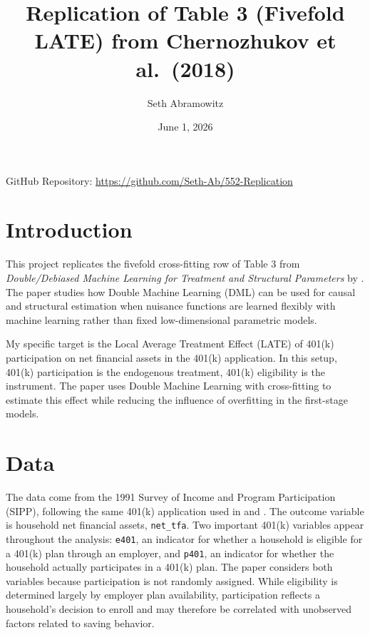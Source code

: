 \documentclass[12pt]{article}
\title{Replication of Table 3 (Fivefold LATE) from Chernozhukov et al.\ (2018)}
\author{Seth Abramowitz}
\date{June 1, 2026}
\begin{document}
\maketitle

\begin{center}
\small GitHub Repository: \href{https://github.com/Seth-Ab/552-Replication}{https://github.com/Seth-Ab/552-Replication}
\end{center}

\section{Introduction}

This project replicates the fivefold cross-fitting row of Table 3 from \textit{Double/Debiased Machine Learning for Treatment and Structural Parameters} by \citet{chernozhukov2018}. The paper studies how Double Machine Learning (DML) can be used for causal and structural estimation when nuisance functions are learned flexibly with machine learning rather than fixed low-dimensional parametric models.

My specific target is the Local Average Treatment Effect (LATE) of 401(k) participation on net financial assets in the 401(k) application. In this setup, 401(k) participation is the endogenous treatment, 401(k) eligibility is the instrument. The paper uses Double Machine Learning with cross-fitting to estimate this effect while reducing the influence of overfitting in the first-stage models.

\section{Data}

The data come from the 1991 Survey of Income and Program Participation (SIPP), following the same 401(k) application used in \citet{abadie2003} and \citet{chernozhukov2018}. The outcome variable is household net financial assets, \texttt{net\_tfa}. Two important 401(k) variables appear throughout the analysis: \texttt{e401}, an indicator for whether a household is eligible for a 401(k) plan through an employer, and \texttt{p401}, an indicator for whether the household actually participates in a 401(k) plan. The paper considers both variables because participation is not randomly assigned. While eligibility is determined largely by employer plan availability, participation reflects a household's decision to enroll and may therefore be correlated with unobserved factors related to saving behavior.
\end{document}
